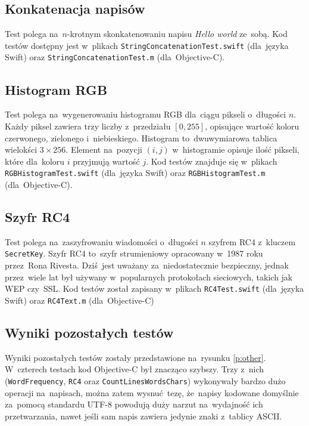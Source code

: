 \documentclass[mgr, shortabstract]{iithesis}
\begin{document}
\subsection{Konkatenacja napisów}

Test polega na~$n$-krotnym skonkatenowaniu napisu \textit{Hello world} ze~sobą. Kod testów dostępny jest w~plikach \texttt{StringConcatenationTest.swift} (dla~języka Swift) oraz \texttt{StringConcatenationTest.m} (dla~Objective-C).

\subsection{Histogram RGB}

Test polega na~wygenerowaniu histogramu RGB dla~ciągu pikseli o~długości $n$. Każdy piksel zawiera trzy liczby z~przedziału $\left[0, 255\right]$, opisujące wartość koloru czerwonego, zielonego i~niebieskiego. Histogram to~dwuwymiarowa tablica wielokści $3 \times 256$. Element na~pozycji $(i, j)$ w~histogramie opisuje ilość pikseli, które dla~koloru $i$ przyjmują wartość $j$. Kod testów znajduje się w~plikach \texttt{RGBHistogramTest.swift} (dla~języka Swift) oraz \texttt{RGBHistogramTest.m} (dla~Objective-C).

\subsection{Szyfr RC4}

Test polega na~zaszyfrowaniu wiadomości o~długości $n$ szyfrem RC4 z~kluczem \texttt{SecretKey}. Szyfr RC4 to~szyfr strumieniowy opracowany w~1987 roku przez~Rona Rivesta. Dziś jest uważany za~niedostatecznie bezpieczny, jednak przez~wiele lat był używany w~popularnych protokołach sieciowych, takich jak WEP czy~SSL. Kod testów został zapisany w~plikach \texttt{RC4Test.swift} (dla~języka Swift) oraz \texttt{RC4Text.m} (dla~Objective-C)

\subsection{Wyniki pozostałych testów}

Wyniki pozostałych testów zostały przedstawione na~rysunku \ref{p:other}. W~czterech testach kod Objective-C był znacząco szybszy. Trzy z~nich (\texttt{WordFrequency}, \texttt{RC4} oraz \texttt{CountLinesWordsChars}) wykonywały bardzo dużo operacji na~napisach, można zatem wysnuć tezę, że~napisy kodowane domyślnie za~pomocą standardu UTF-8 powodują duży narzut na~wydajność ich przetwarzania, nawet jeśli sam napis zawiera jedynie znaki z~tablicy ASCII.
\end{document}
